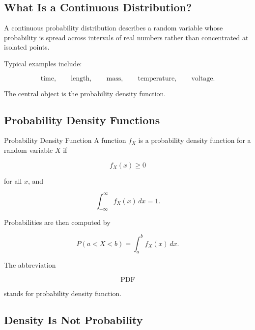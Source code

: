 \subsection{What Is a Continuous Distribution?}
\label{subsec:what-is-continuous-distribution}

A continuous probability distribution describes a random variable whose
probability is spread across intervals of real numbers rather than
concentrated at isolated points.

Typical examples include:

\[
\text{time},
\qquad
\text{length},
\qquad
\text{mass},
\qquad
\text{temperature},
\qquad
\text{voltage}.
\]

The central object is the probability density function.

\subsection{Probability Density Functions}
\label{subsec:probability-density-functions}

\begin{definitionbox}{Probability Density Function}
A function \(f_X\) is a probability density function for a random
variable \(X\) if

\[
\boxed{
f_X(x)\geq0
}
\]

for all \(x\), and

\[
\boxed{
\int_{-\infty}^{\infty}
f_X(x)\,dx
=
1.
}
\]

Probabilities are then computed by

\[
\boxed{
P(a<X<b)
=
\int_a^b f_X(x)\,dx.
}
\]
\end{definitionbox}

The abbreviation

\[
\boxed{
\text{PDF}
}
\]

stands for probability density function.

\subsection{Density Is Not Probability}
\label{subsec:density-not-probability-continuous}

